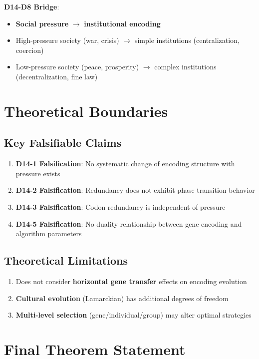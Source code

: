 \documentclass[12pt,a4paper]{article}
\begin{document}
\textbf{D14-D8 Bridge}:
\begin{itemize}
    \item \textbf{Social pressure} $\rightarrow$ \textbf{institutional encoding}
    \item High-pressure society (war, crisis) $\rightarrow$ simple institutions (centralization, coercion)
    \item Low-pressure society (peace, prosperity) $\rightarrow$ complex institutions (decentralization, fine law)
\end{itemize}

\section{Theoretical Boundaries}

\subsection{Key Falsifiable Claims}
\begin{enumerate}
    \item \textbf{D14-1 Falsification}: No systematic change of encoding structure with pressure exists
    \item \textbf{D14-2 Falsification}: Redundancy does not exhibit phase transition behavior
    \item \textbf{D14-3 Falsification}: Codon redundancy is independent of pressure
    \item \textbf{D14-5 Falsification}: No duality relationship between gene encoding and algorithm parameters
\end{enumerate}

\subsection{Theoretical Limitations}
\begin{enumerate}
    \item Does not consider \textbf{horizontal gene transfer} effects on encoding evolution
    \item \textbf{Cultural evolution} (Lamarckian) has additional degrees of freedom
    \item \textbf{Multi-level selection} (gene/individual/group) may alter optimal strategies
\end{enumerate}

\section{Final Theorem Statement}
\end{document}
